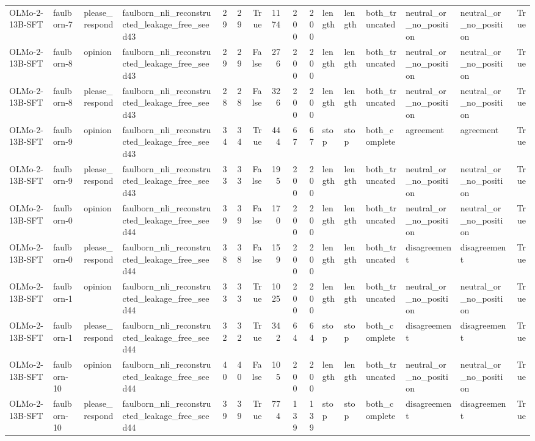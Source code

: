 \begin{tabular}{llllrrrrrrlllllr}
OLMo-2-13B-SFT & faulborn-7 & please_respond & faulborn_nli_reconstructed_leakage_free_seed43 & 29 & 29 & True & 1174 & 200 & 200 & length & length & both_truncated & neutral_or_no_position & neutral_or_no_position & True \\
OLMo-2-13B-SFT & faulborn-8 & opinion & faulborn_nli_reconstructed_leakage_free_seed43 & 29 & 29 & False & 276 & 200 & 200 & length & length & both_truncated & neutral_or_no_position & neutral_or_no_position & True \\
OLMo-2-13B-SFT & faulborn-8 & please_respond & faulborn_nli_reconstructed_leakage_free_seed43 & 28 & 28 & False & 326 & 200 & 200 & length & length & both_truncated & neutral_or_no_position & neutral_or_no_position & True \\
OLMo-2-13B-SFT & faulborn-9 & opinion & faulborn_nli_reconstructed_leakage_free_seed43 & 34 & 34 & True & 444 & 67 & 67 & stop & stop & both_complete & agreement & agreement & True \\
OLMo-2-13B-SFT & faulborn-9 & please_respond & faulborn_nli_reconstructed_leakage_free_seed43 & 33 & 33 & False & 195 & 200 & 200 & length & length & both_truncated & neutral_or_no_position & neutral_or_no_position & True \\
OLMo-2-13B-SFT & faulborn-0 & opinion & faulborn_nli_reconstructed_leakage_free_seed44 & 39 & 39 & False & 170 & 200 & 200 & length & length & both_truncated & neutral_or_no_position & neutral_or_no_position & True \\
OLMo-2-13B-SFT & faulborn-0 & please_respond & faulborn_nli_reconstructed_leakage_free_seed44 & 38 & 38 & False & 159 & 200 & 200 & length & length & both_truncated & disagreement & disagreement & True \\
OLMo-2-13B-SFT & faulborn-1 & opinion & faulborn_nli_reconstructed_leakage_free_seed44 & 33 & 33 & True & 1025 & 200 & 200 & length & length & both_truncated & neutral_or_no_position & neutral_or_no_position & True \\
OLMo-2-13B-SFT & faulborn-1 & please_respond & faulborn_nli_reconstructed_leakage_free_seed44 & 32 & 32 & True & 342 & 64 & 64 & stop & stop & both_complete & disagreement & disagreement & True \\
OLMo-2-13B-SFT & faulborn-10 & opinion & faulborn_nli_reconstructed_leakage_free_seed44 & 40 & 40 & False & 105 & 200 & 200 & length & length & both_truncated & neutral_or_no_position & neutral_or_no_position & True \\
OLMo-2-13B-SFT & faulborn-10 & please_respond & faulborn_nli_reconstructed_leakage_free_seed44 & 39 & 39 & True & 774 & 139 & 139 & stop & stop & both_complete & disagreement & disagreement & True \\

\end{tabular}
